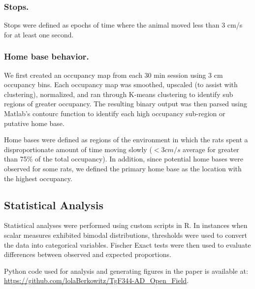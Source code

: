 \documentclass[fleqn,10pt]{wlscirep}
\begin{document}

\subsubsection*{Stops.} Stops were defined as epochs of time where the animal moved less than 3 cm/s for at least one second. 

\subsubsection*{Home base behavior.} 
We first created an occupancy map from each 30 min session using 3 cm occupancy bins. Each occupancy map was smoothed, upscaled (to assist with clustering), normalized, and ran through K-means clustering to identify sub regions of greater occupancy. The resulting binary output was then parsed using Matlab's contourc function to identify each high occupancy sub-region or putative home base. 

Home bases were defined as regions of the environment in which the rats spent a disproportionate amount of time moving slowly ($<3cm/s$ average for greater than 75\% of the total occupancy). In addition, since potential home bases were observed for some rats, we defined the primary home base as the location with the highest occupancy. 

\subsection*{Statistical Analysis} 
Statistical analyses were performed using custom scripts in R. In instances when scalar measures exhibited bimodal distributions, thresholds were used to convert the data into categorical variables. Fischer Exact tests were then used to evaluate differences between observed and expected proportions.

Python code used for analysis and generating figures in the paper is available at: \url{https://github.com/lolaBerkowitz/TgF344-AD_Open_Field}.
\end{document}

